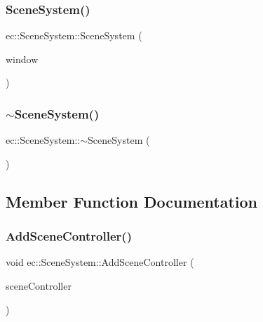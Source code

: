 \subsubsection{\texorpdfstring{Scene\+System()}{SceneSystem()}}
{\footnotesize\ttfamily ec\+::\+Scene\+System\+::\+Scene\+System (\begin{DoxyParamCaption}\item[{\mbox{\hyperlink{classec_1_1_window}{Window}} $\ast$}]{window }\end{DoxyParamCaption})\hspace{0.3cm}{\ttfamily [explicit]}}

\mbox{\label{classec_1_1_scene_system_a612e6cc45dbea62c7ffa4c752f965482}} 
\subsubsection{\texorpdfstring{$\sim$\+Scene\+System()}{~SceneSystem()}}
{\footnotesize\ttfamily ec\+::\+Scene\+System\+::$\sim$\+Scene\+System (\begin{DoxyParamCaption}{ }\end{DoxyParamCaption})}



\subsection{Member Function Documentation}
\mbox{\label{classec_1_1_scene_system_abd2b67cb6b5378370e43719b8703e6b4}} 
\subsubsection{\texorpdfstring{Add\+Scene\+Controller()}{AddSceneController()}}
{\footnotesize\ttfamily void ec\+::\+Scene\+System\+::\+Add\+Scene\+Controller (\begin{DoxyParamCaption}\item[{std\+::unique\+\_\+ptr$<$ \mbox{\hyperlink{classec_1_1_scene_controller}{Scene\+Controller}} $>$}]{scene\+Controller }\end{DoxyParamCaption})}

